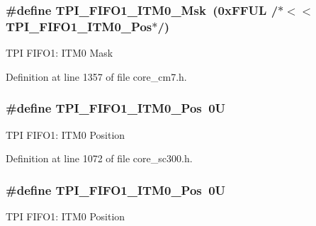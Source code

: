 \subsubsection[{\texorpdfstring{T\+P\+I\+\_\+\+F\+I\+F\+O1\+\_\+\+I\+T\+M0\+\_\+\+Msk}{TPI_FIFO1_ITM0_Msk}}]{\setlength{\rightskip}{0pt plus 5cm}\#define T\+P\+I\+\_\+\+F\+I\+F\+O1\+\_\+\+I\+T\+M0\+\_\+\+Msk~(0x\+F\+F\+U\+L /$\ast$$<$$<$ T\+P\+I\+\_\+\+F\+I\+F\+O1\+\_\+\+I\+T\+M0\+\_\+\+Pos$\ast$/)}\hypertarget{group___c_m_s_i_s___t_p_i_ga8ae09f544fc1a428797e2a150f14a4c9}{}\label{group___c_m_s_i_s___t_p_i_ga8ae09f544fc1a428797e2a150f14a4c9}
T\+PI F\+I\+F\+O1\+: I\+T\+M0 Mask 

Definition at line 1357 of file core\+\_\+cm7.\+h.

\subsubsection[{\texorpdfstring{T\+P\+I\+\_\+\+F\+I\+F\+O1\+\_\+\+I\+T\+M0\+\_\+\+Pos}{TPI_FIFO1_ITM0_Pos}}]{\setlength{\rightskip}{0pt plus 5cm}\#define T\+P\+I\+\_\+\+F\+I\+F\+O1\+\_\+\+I\+T\+M0\+\_\+\+Pos~0U}\hypertarget{group___c_m_s_i_s___t_p_i_ga2188671488417a52abb075bcd4d73440}{}\label{group___c_m_s_i_s___t_p_i_ga2188671488417a52abb075bcd4d73440}
T\+PI F\+I\+F\+O1\+: I\+T\+M0 Position 

Definition at line 1072 of file core\+\_\+sc300.\+h.

\subsubsection[{\texorpdfstring{T\+P\+I\+\_\+\+F\+I\+F\+O1\+\_\+\+I\+T\+M0\+\_\+\+Pos}{TPI_FIFO1_ITM0_Pos}}]{\setlength{\rightskip}{0pt plus 5cm}\#define T\+P\+I\+\_\+\+F\+I\+F\+O1\+\_\+\+I\+T\+M0\+\_\+\+Pos~0U}\hypertarget{group___c_m_s_i_s___t_p_i_ga2188671488417a52abb075bcd4d73440}{}\label{group___c_m_s_i_s___t_p_i_ga2188671488417a52abb075bcd4d73440}
T\+PI F\+I\+F\+O1\+: I\+T\+M0 Position 

